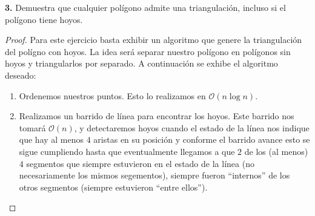 \textbf{3.} Demuestra que cualquier polígono admite una triangulación,
incluso si el polígono tiene hoyos.\newline

\begin{proof}
  Para este ejercicio basta exhibir un algoritmo que genere la triangulación
  del polígno con hoyos. La idea será separar nuestro polígono en polígonos
  sin hoyos y triangularlos por separado. A continuación se exhibe el algoritmo
  deseado:
  \begin{enumerate}
  \item Ordenemos nuestros puntos. Esto lo realizamos en $\mathcal{O}(n \log n)$.
  \item Realizamos un barrido de línea para encontrar los hoyos. Este barrido
    nos tomará $\mathcal{O}(n)$, y detectaremos hoyos cuando el estado de la
    línea nos indique que hay al menos $4$ aristas en su posición y conforme
    el barrido avance esto se sigue cumpliendo hasta que eventualmente llegamos
    a que $2$ de los (al menos) $4$ segmentos que siempre estuvieron en el estado
    de la línea (no necesariamente los mismos segementos), siempre fueron ``internos''
    de los otros segmentos (siempre estuvieron ``entre ellos'').


\end{enumerate}
\end{proof}
